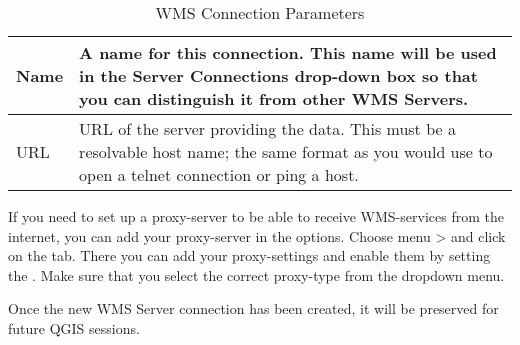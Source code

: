 \begin{table}[ht]
\centering
\caption{WMS Connection Parameters}\label{tab:wms_connection_parms}\medskip
 \begin{tabular}{|l|p{5in}|}
\hline Name & A name for this connection.  This name will be used in the
 Server Connections drop-down box so that you can distinguish it from
 other WMS Servers. \\
\hline URL \index{WMS!URL} & URL of the server providing the data.
 This must be a resolvable host name; the same format as you would use 
 to open a telnet connection or ping a host. \\
\hline
\end{tabular}
\end{table}

If you need to set up a proxy-server to be able to receive WMS-services
from the internet, you can add your proxy-server in the options.
Choose menu  > 
and click on the  tab. There you can add your proxy-settings 
and enable them by setting the .
Make sure that you select the correct proxy-type from the
 dropdown menu.

Once the new WMS Server connection has been created, it will be 
preserved for future QGIS sessions.

\begin{Tip}[ht]\caption{\textsc{On WMS Server URLs}}
\end{Tip}

